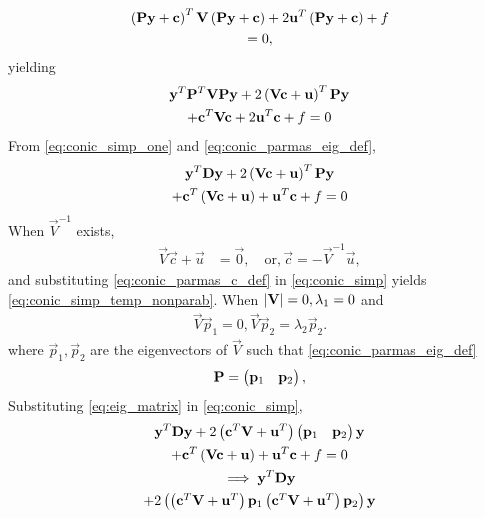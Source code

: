 \documentclass[journal,12pt,twocolumn]{IEEEtran}
\renewcommand\thesection{\arabic{section}}
\renewcommand\thesubsection{\thesection.\arabic{subsection}}
\begin{document}
\begin{enumerate}[label=\thesubsection.\arabic*.,ref=\thesubsection.\theenumi]
\begin{multline}
\left(\mathbf{P}\mathbf{y}+\mathbf{c}\right)^T\mathbf{V}\left(\mathbf{P}\mathbf{y}+\mathbf{c}\right)+2\mathbf{u}^T\left(\mathbf{P}\mathbf{y}+\mathbf{c}\right)+ f
	\\
	= 0, 
\end{multline}
yielding 
\begin{multline}
\mathbf{y}^T\mathbf{P}^T\mathbf{V}\mathbf{P}\mathbf{y}+2\left(\mathbf{V}\mathbf{c}+\mathbf{u}\right)^T\mathbf{P}\mathbf{y}
\\
+  \mathbf{c}^T\mathbf{V}\mathbf{c} + 2\mathbf{u}^T\mathbf{c} + f= 0
\label{eq:conic_simp_one}
\end{multline}
%
From \eqref{eq:conic_simp_one} and \eqref{eq:conic_parmas_eig_def},
\begin{multline}
\mathbf{y}^T\mathbf{D}\mathbf{y}+2\left(\mathbf{V}\mathbf{c}+\mathbf{u}\right)^T\mathbf{P}\mathbf{y}
\\
+  \mathbf{c}^T\left(\mathbf{V}\mathbf{c} + \mathbf{u}\right)+ \mathbf{u}^T\mathbf{c} + f= 0
\label{eq:conic_simp}
\end{multline}
When $\vec{V}^{-1}$ exists,
\begin{align}
\vec{V}\vec{c}+\vec{u} &= \vec{0}, \quad \text{or}, \vec{c} = -\vec{V}^{-1}\vec{u},
\label{eq:conic_parmas_c_def}
\end{align}
%
and substituting \eqref{eq:conic_parmas_c_def}
in \eqref{eq:conic_simp}
yields \eqref{eq:conic_simp_temp_nonparab}. 
When $\left\vert\mathbf{V}\right\vert = 0, \lambda_1 = 0$ and 
\begin{align}
\vec{V}\vec{p}_1 = 0, 
\vec{V}\vec{p}_2 = \lambda_2\vec{p}_2.
\label{eq:conic_parab_eig_prop} 
\end{align}
where $\vec{p}_1,\vec{p}_2$ are the eigenvectors of $\vec{V}$ such that  \eqref{eq:conic_parmas_eig_def}
%
\begin{align}
\mathbf{P} = \begin{pmatrix}\mathbf{p}_1 & \mathbf{p}_2\end{pmatrix},
\label{eq:eig_matrix}
\end{align}
Substituting \eqref{eq:eig_matrix}
in \eqref{eq:conic_simp},
\begin{multline}
	\vec{y}^T\vec{D}\vec{y}+2\brak{\vec{c}^T\vec{V}+\vec{u}^T}\myvec{\vec{p}_1 & \vec{p}_2}\vec{y}
\\
+  \vec{c}^T\brak{\vec{V}\vec{c} + \vec{u}}+ \vec{u}^T\vec{c} + f= 0
\\
\implies \vec{y}^T\vec{D}\vec{y}
\\
+2\myvec{\brak{\vec{c}^T\vec{V}+\vec{u}^T}\vec{p}_1  \brak{\vec{c}^T\vec{V}+\vec{u}^T}\vec{p}_2}\vec{y}

\end{multline}
\end{enumerate}
\end{document}
